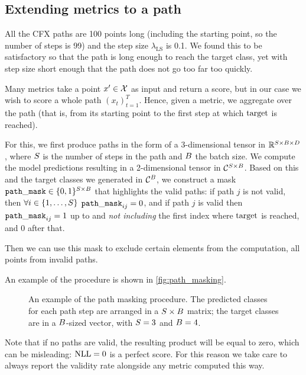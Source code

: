 \documentclass[../main.tex]{subfiles}
\begin{document}
\subsection{Extending metrics to a path}
\label{exp/masking}

All the CFX paths are 100 points long (including the starting point, so the number of steps is 99) and the step size $\lambda_\text{LS}$ is 0.1. We found this to be satisfactory so that the path is long enough to reach the target class, yet with step size short enough that the path does not go too far too quickly.

Many metrics take a point $x' \in \mathcal{X}$ as input and return a score, but in our case we wish to score a whole path $(x_t)_{t=1}^T$.
Hence, given a metric, we aggregate over the path (that is, from its starting point to the first step at which $\mathrm{target}$ is reached).

For this, we first produce paths in the form of a 3-dimensional tensor in $\mathbb{R}^{S \times B \times D}$,
where $S$ is the number of steps in the path and $B$ the batch size.
We compute the model predictions resulting in a 2-dimensional tensor in $\mathcal{C}^{S \times B}$.
Based on this and the target classes we generated in $\mathcal{C}^B$, we construct a mask $\mathtt{path\_mask} \in \{0, 1\}^{S \times B}$ that highlights the valid paths:
if path $j$ is not valid, then
$\forall i \in \{1, \ldots, S\}$ ${\mathtt{path\_mask}_{ij} = 0}$, and if path $j$ is valid then $\mathtt{path\_mask}_{ij} = 1$ up to and \emph{not including} the first index where $\mathrm{target}$ is reached, and 0 after that.

Then we can use this mask to exclude certain elements from the computation, \eg{} all points from invalid paths.

An example of the procedure is shown in \autoref{fig:path_masking}.

\begin{figure}[htbp]
	\centering
    
	\caption{An example of the path masking procedure. The predicted classes for each path step are arranged in a $S \times B$ matrix; the target classes are in a $B$-sized vector, with $S=3$ and $B = 4$.}
	\label{fig:path_masking}
\end{figure}

Note that if no paths are valid, the resulting product will be equal to zero, which can be misleading: $\text{NLL} = 0$ is a perfect score.
For this reason we take care to always report the validity rate alongside any metric computed this way.
\end{document}
